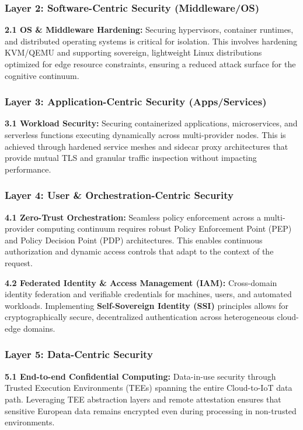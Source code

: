\documentclass[12pt,a4paper]{article}
\begin{document}
\subsubsection*{Layer 2: Software-Centric Security (Middleware/OS)}
\textbf{2.1 OS \& Middleware Hardening:} Securing hypervisors, container runtimes, and distributed operating systems is critical for isolation. This involves hardening KVM/QEMU and supporting sovereign, lightweight Linux distributions optimized for edge resource constraints, ensuring a reduced attack surface for the cognitive continuum.

\subsubsection*{Layer 3: Application-Centric Security (Apps/Services)}
\textbf{3.1 Workload Security:} Securing containerized applications, microservices, and serverless functions executing dynamically across multi-provider nodes. This is achieved through hardened service meshes and sidecar proxy architectures that provide mutual TLS and granular traffic inspection without impacting performance.

\subsubsection*{Layer 4: User \& Orchestration-Centric Security}
\textbf{4.1 Zero-Trust Orchestration:} Seamless policy enforcement across a multi-provider computing continuum requires robust Policy Enforcement Point (PEP) and Policy Decision Point (PDP) architectures. This enables continuous authorization and dynamic access controls that adapt to the context of the request.

\textbf{4.2 Federated Identity \& Access Management (IAM):} Cross-domain identity federation and verifiable credentials for machines, users, and automated workloads. Implementing \textbf{Self-Sovereign Identity (SSI)} principles allows for cryptographically secure, decentralized authentication across heterogeneous cloud-edge domains.

\subsubsection*{Layer 5: Data-Centric Security}
\textbf{5.1 End-to-end Confidential Computing:} Data-in-use security through Trusted Execution Environments (TEEs) spanning the entire Cloud-to-IoT data path. Leveraging TEE abstraction layers and remote attestation ensures that sensitive European data remains encrypted even during processing in non-trusted environments.
\end{document}
